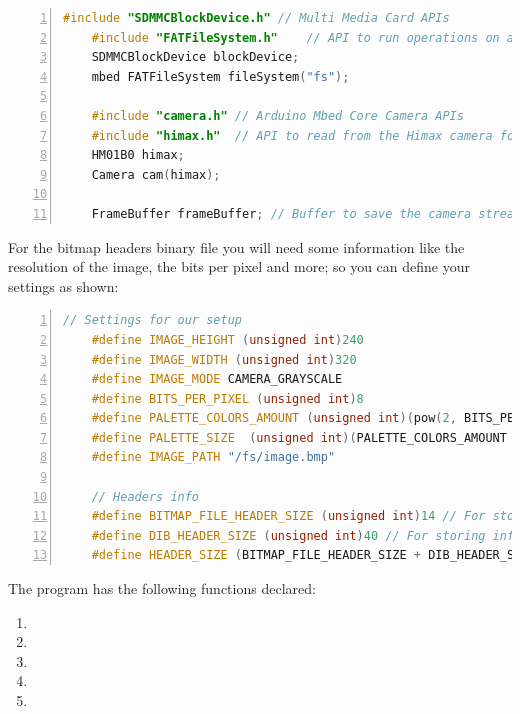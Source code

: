 \begin{lstlisting}[language=C++, frame=single, numbers=left, basicstyle=\ttfamily\small]
	#include "SDMMCBlockDevice.h" // Multi Media Card APIs
	#include "FATFileSystem.h"    // API to run operations on a FAT file system
	SDMMCBlockDevice blockDevice;
	mbed FATFileSystem fileSystem("fs");
	
	#include "camera.h" // Arduino Mbed Core Camera APIs
	#include "himax.h"  // API to read from the Himax camera found on the Portenta Vision Shield
	HM01B0 himax;
	Camera cam(himax);
	
	FrameBuffer frameBuffer; // Buffer to save the camera stream
\end{lstlisting}

For the bitmap headers binary file you will need some information like the resolution of the image, the bits per pixel and more; so you can define your settings as shown: \cite{portentaCameraToBitmap:2024}

\begin{lstlisting}[language=C++, frame=single, numbers=left, basicstyle=\ttfamily\small]
	// Settings for our setup
	#define IMAGE_HEIGHT (unsigned int)240
	#define IMAGE_WIDTH (unsigned int)320
	#define IMAGE_MODE CAMERA_GRAYSCALE
	#define BITS_PER_PIXEL (unsigned int)8
	#define PALETTE_COLORS_AMOUNT (unsigned int)(pow(2, BITS_PER_PIXEL))
	#define PALETTE_SIZE  (unsigned int)(PALETTE_COLORS_AMOUNT * 4) // 4 bytes = 32bit per color (3 bytes RGB and 1 byte 0x00)
	#define IMAGE_PATH "/fs/image.bmp"
	
	// Headers info
	#define BITMAP_FILE_HEADER_SIZE (unsigned int)14 // For storing general information about the bitmap image file
	#define DIB_HEADER_SIZE (unsigned int)40 // For storing information about the image and define the pixel format
	#define HEADER_SIZE (BITMAP_FILE_HEADER_SIZE + DIB_HEADER_SIZE)
\end{lstlisting}

The program has the following functions declared: \cite{portentaCameraToBitmap:2024}
\begin{enumerate}
	\item {}
	\item {}
	\item {}
	\item {}
	\item {}
\end{enumerate}

